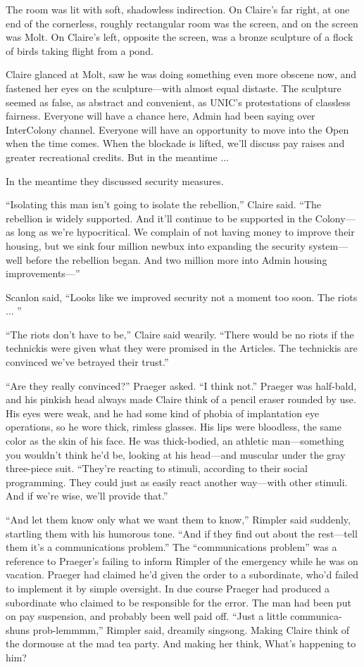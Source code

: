 The room was lit with soft, shadowless indirection. On Claire's far right, at one end of the cornerless, roughly rectangular room was the screen, and on the screen was Molt. On Claire's left, opposite the screen, was a bronze sculpture of a flock of birds taking flight from a pond.

Claire glanced at Molt, saw he was doing something even more obscene now, and fastened her eyes on the sculpture—with almost equal distaste. The sculpture seemed as false, as abstract and convenient, as UNIC's protestations of classless fairness. Everyone will have a chance here, Admin had been saying over InterColony channel. Everyone will have an opportunity to move into the Open when the time comes. When the blockade is lifted, we'll discuss pay raises and greater recreational credits. But in the meantime ...

In the meantime they discussed security measures.

``Isolating this man isn't going to isolate the rebellion,'' Claire said. ``The rebellion is widely supported. And it'll continue to be supported in the Colony—as long as we're hypocritical. We complain of not having money to improve their housing, but we sink four million newbux into expanding the security system—well before the rebellion began. And two million more into Admin housing improvements—''

Scanlon said, ``Looks like we improved security not a moment too soon. The riots ... ''

``The riots don't have to be,'' Claire said wearily. ``There would be no riots if the technickis were given what they were promised in the Articles. The technickis are convinced we've betrayed their trust.''

``Are they really convinced?'' Praeger asked. ``I think not.'' Praeger was half-bald, and his pinkish head always made Claire think of a pencil eraser rounded by use. His eyes were weak, and he had some kind of phobia of implantation eye operations, so he wore thick, rimless glasses. His lips were bloodless, the same color as the skin of his face. He was thick-bodied, an athletic man—something you wouldn't think he'd be, looking at his head—and muscular under the gray three-piece suit. ``They're reacting to stimuli, according to their social programming. They could just as easily react another way—with other stimuli. And if we're wise, we'll provide that.''

``And let them know only what we want them to know,'' Rimpler said suddenly, startling them with his humorous tone. ``And if they find out about the rest—tell them it's a communications problem.'' The ``communications problem'' was a reference to Praeger's failing to inform Rimpler of the emergency while he was on vacation. Praeger had claimed he'd given the order to a subordinate, who'd failed to implement it by simple oversight. In due course Praeger had produced a subordinate who claimed to be responsible for the error. The man had been put on pay suspension, and probably been well paid off. ``Just a little communica-shuns prob-lemmmm,'' Rimpler said, dreamily singsong. Making Claire think of the dormouse at the mad tea party. And making her think, What's happening to him?

